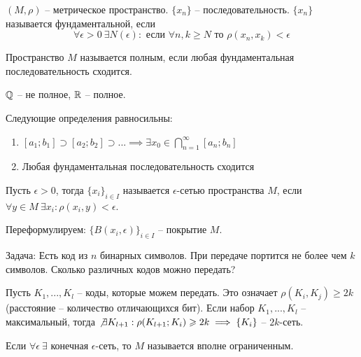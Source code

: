 \documentclass[main]{subfiles}
\begin{document}
\begin{definition}
    $(M, \rho)$ -- метрическое пространство.
    $\{x_n\}$ -- последовательность.
    $\{x_n\}$ называется фундаментальной, если
    \[\forall \epsilon >0\ \exists N(\epsilon): \text{ если } \forall n, k \ge N \text{ то }  \rho(x_n, x_k) < \epsilon\]
\end{definition}
\begin{definition}
    Пространство $M$ называется полным, если любая фундаментальная последовательность сходится.
\end{definition}
\begin{example}
    $\Q$  -- не полное, $\R$ -- полное.
\end{example}
\begin{theorem}
    Следующие определения равносильны:
    \begin{enumerate}
        \item $[a_1; b_1] \supset [a_2; b_2] \supset ... \implies \exists x_0 \in \bigcap_{n=1}^\infty [a_n; b_n]$
        \item Любая фундаментальная последовательность сходится
    \end{enumerate}
\end{theorem}

\begin{definition}
    Пусть $\epsilon >0$, тогда $\{x_i\}_{i \in I}$ называется $\epsilon$-сетью пространства $M$,
    если $\forall y \in M\ \exists x_i: \rho(x_i, y) < \epsilon$.

    Переформулируем: $\{B(x_i, \epsilon)\}_{i \in I}$ -- покрытие $M$.
\end{definition}

Задача: Есть код из $n$ бинарных символов.
При передаче портится не более чем $k$ символов.
Сколько различных кодов можно передать?

Пусть $K_1, ..., K_l$ -- коды, которые можем передать.
Это означает $\rho(K_i, K_j) \ge 2 k$ (расстояние -- количество отличающихся бит).
Если набор $K_1, ..., K_l$ -- максимальный, тогда $\not \exists K_{l+1} : \rho(K_{l+1}; K_i) \ge 2k \implies \{K_i\}$ -- $2k$-сеть.

\begin{definition}
    Если $\forall \epsilon\ \exists$ конечная $\epsilon$-сеть, то $M$ называется вполне ограниченным.
\end{definition}
\end{document}

